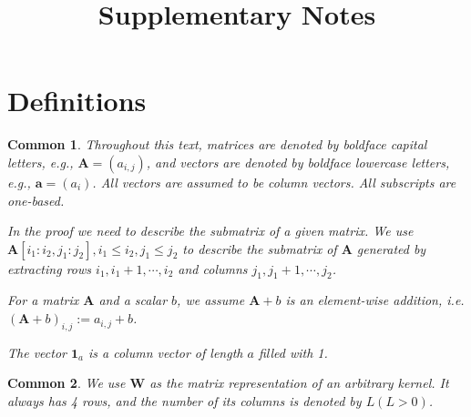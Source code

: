 \documentclass[12pt]{article}
\title{Supplementary Notes}
\date{}                                            %
\newcommand{\vect}[1]{\mathbf{#1}}
\newcommand{\matrixSymbol}[1]{\mathbf{#1}}
\newtheorem{common}{Common}
\begin{document}
\maketitle

\section{Definitions}


\begin{common}
Throughout this text, matrices are denoted by boldface capital letters, e.g., $\matrixSymbol{A} = (a_{i, j})$, and vectors are denoted by boldface lowercase letters, e.g., $\vect{a}=(a_{i})$. All vectors are assumed to be column vectors. All subscripts are one-based.

In the proof we need to describe the submatrix of a given matrix. We use $\matrixSymbol{A}[i_1:i_2, j_1:j_2], i_1 \le i_2 , j_1 \le j_2 $ to describe the submatrix of $\matrixSymbol{A}$ generated by extracting rows $i_1 , i_1 +1 , \cdots, i_2$ and columns $j_1, j_1 + 1, \cdots, j_2$.

For a matrix $\matrixSymbol{A}$ and a scalar $b$, we assume $\matrixSymbol{A} + b$ is an element-wise addition, i.e. $(\matrixSymbol{A} + b)_{i, j} := a_{i, j} + b$.

The vector $\vect{1}_{a}$ is a column vector of length $a$ filled with 1.
\end{common}

\begin{common}
We use $\matrixSymbol{W}$ as the matrix representation of an arbitrary kernel. It always has 4 rows, and the number of its columns is denoted by $L (L > 0)$.
\end{common}
\end{document}
